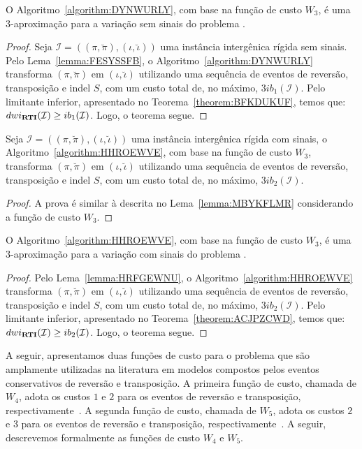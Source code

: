 \begin{theorem}\label{theorem:YFYDIUAB}
O Algoritmo~\ref{algorithm:DYNWURLY}, com base na função de custo $W_3$, é uma $3$-aproximação para a variação sem sinais do problema \SbWIRTI{}.
\end{theorem}
\begin{proof}
Seja $\mathcal{I} = ((\pi,\breve\pi),(\iota,\breve\iota))$ uma instância intergênica rígida sem sinais. Pelo Lema~\ref{lemma:FESYSSFB}, o Algoritmo~\ref{algorithm:DYNWURLY} transforma $(\pi,\breve\pi)$ em $(\iota,\breve\iota)$ utilizando uma sequência de eventos de reversão, transposição e indel $S$, com um custo total de, no máximo, $3ib_1(\mathcal{I})$. Pelo limitante inferior, apresentado no Teorema~\ref{theorem:BFKDUKUF}, temos que: $dwi_{\textbf{RTI}}(\mathcal{I}) \ge ib_1(\mathcal{I})$. Logo, o teorema segue.
\end{proof}

\begin{lemma}\label{lemma:HRFGEWNU}
Seja $\mathcal{I} = ((\pi,\breve\pi),(\iota,\breve\iota))$ uma instância intergênica rígida com sinais, o Algoritmo~\ref{algorithm:HHROEWVE}, com base na função de custo $W_3$, transforma $(\pi,\breve\pi)$ em $(\iota,\breve\iota)$ utilizando uma sequência de eventos de reversão, transposição e indel $S$, com um custo total de, no máximo, $3ib_2(\mathcal{I})$.
\end{lemma}
\begin{proof}
  A prova é similar à descrita no Lema~\ref{lemma:MBYKFLMR} considerando a função de custo $W_3$.
\end{proof}

\begin{theorem}\label{theorem:UMSMTVTN}
O Algoritmo~\ref{algorithm:HHROEWVE}, com base na função de custo $W_3$, é uma $3$-aproximação para a variação com sinais do problema \SbWIRTI{}.
\end{theorem}
\begin{proof}
Pelo Lema~\ref{lemma:HRFGEWNU}, o Algoritmo~\ref{algorithm:HHROEWVE} transforma $(\pi,\breve\pi)$ em $(\iota,\breve\iota)$ utilizando uma sequência de eventos de reversão, transposição e indel $S$, com um custo total de, no máximo, $3ib_2(\mathcal{I})$. Pelo limitante inferior, apresentado no Teorema~\ref{theorem:ACJPZCWD}, temos que: $dwi_{\textbf{RTI}}(\mathcal{I}) \ge ib_2(\mathcal{I})$. Logo, o teorema segue.
\end{proof}

A seguir, apresentamos duas funções de custo para o problema \SbWIRT{} que são amplamente utilizadas na literatura em modelos compostos pelos eventos conservativos de reversão e transposição. A primeira função de custo, chamada de $W_4$, adota os custos $1$ e $2$ para os eventos de reversão e transposição, respectivamente~\cite{2002-eriksen}. A segunda função de custo, chamada de $W_5$, adota os custos $2$ e $3$ para os eventos de reversão e transposição, respectivamente~\cite{2019a-oliveira-etal}. A seguir, descrevemos formalmente as funções de custo $W_4$ e $W_5$.

